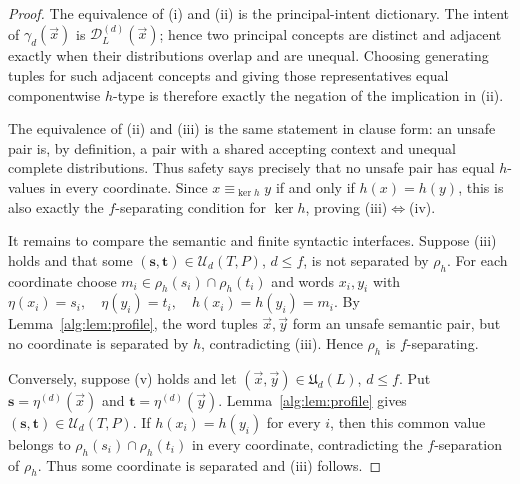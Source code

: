 \documentclass[10pt,a4paper]{article}
\theoremstyle{definition}
\theoremstyle{remark}
\newcommand{\D}{\mathcal D}
\begin{document}
\begin{proof}
The equivalence of \textup{(i)} and \textup{(ii)} is the principal-intent
dictionary.  The intent of \(\gamma_d(\vec x)\) is
\(\D_L^{(d)}(\vec x)\); hence two principal concepts are distinct and adjacent
exactly when their distributions overlap and are unequal.  Choosing generating tuples for such adjacent concepts and giving those
representatives equal componentwise \(h\)-type is therefore exactly the negation
of the implication in \textup{(ii)}.

The equivalence of \textup{(ii)} and \textup{(iii)} is the same statement in
clause form: an unsafe pair is, by definition, a pair with a shared accepting
context and unequal complete distributions.  Thus safety says precisely that
no unsafe pair has equal \(h\)-values in every coordinate.  Since
\(x\equiv_{\ker h}y\) if and only if \(h(x)=h(y)\), this is also exactly the
\(f\)-separating condition for \(\ker h\), proving
\textup{(iii)}\(\Longleftrightarrow\)\textup{(iv)}.

It remains to compare the semantic and finite syntactic interfaces.  Suppose
\textup{(iii)} holds and that some
\((\mathbf s,\mathbf t)\in\mathcal U_d(T,P)\), \(d\le f\), is not separated
by \(\rho_h\).  For each coordinate choose
\(m_i\in\rho_h(s_i)\cap\rho_h(t_i)\)
and words \(x_i,y_i\) with
\(\eta(x_i)=s_i,\quad \eta(y_i)=t_i,\quad h(x_i)=h(y_i)=m_i.\)
By Lemma~\ref{alg:lem:profile}, the word tuples \(\vec x,\vec y\) form an
unsafe semantic pair, but no coordinate is separated by \(h\), contradicting
\textup{(iii)}.  Hence \(\rho_h\) is \(f\)-separating.

Conversely, suppose \textup{(v)} holds and let
\((\vec x,\vec y)\in\mathfrak U_d(L)\), \(d\le f\).  Put
\(\mathbf s=\eta^{(d)}(\vec x)\) and
\(\mathbf t=\eta^{(d)}(\vec y)\).  Lemma~\ref{alg:lem:profile} gives
\((\mathbf s,\mathbf t)\in\mathcal U_d(T,P)\).  If
\(h(x_i)=h(y_i)\) for every \(i\), then this common value belongs to
\(\rho_h(s_i)\cap\rho_h(t_i)\) in every coordinate, contradicting the
\(f\)-separation of \(\rho_h\).  Thus some coordinate is separated and
\textup{(iii)} follows.
\end{proof}
\end{document}
